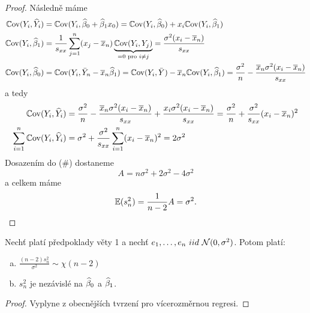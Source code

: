 \begin{proof}
	Následně máme
	\begin{align*}
	\mathbb{C}\mathrm{ov}(Y_i, \widehat{Y}_i) & = \mathbb{C}\mathrm{ov}(Y_i, \widehat{\beta}_0 + \widehat{\beta}_1 x_0) = \mathbb{C}\mathrm{ov}(Y_i, \widehat{\beta}_0) + x_i \mathbb{C}\mathrm{ov}(Y_i, \widehat{\beta}_1) \\
	\mathbb{C}\mathrm{ov}(Y_i, \widehat{\beta}_1) & = \frac{1}{s_{xx}} \sum_{j=1}^{n} (x_j - \overline{x}_n) \underbrace{\mathbb{C}\mathrm{ov}(Y_i, Y_j)}_{= 0 \text{ pro } i \neq j} = \frac{\sigma^2(x_i - \overline{x}_n)}{s_{xx}} \\
	\mathbb{C}\mathrm{ov}(Y_i, \widehat{\beta}_0) & = \mathbb{C}\mathrm{ov}(Y_i, \bar{Y}_n - \overline{x}_n \widehat{\beta}_1) = \mathbb{C}\mathrm{ov}(Y_i, \bar{Y}) - \overline{x}_n \mathbb{C}\mathrm{ov}(Y_i, \widehat{\beta}_1) = \frac{\sigma^2}{n} - \frac{\overline{x}_n \sigma^2 (x_i - \overline{x}_n)}{s_{xx}} \\
	\end{align*}
	a tedy
	\begin{align*}
		\mathbb{C}\mathrm{ov}(Y_i, \widehat{Y}_i) & = \frac{\sigma^2}{n} - \frac{\overline{x}_n \sigma^2 (x_i - \overline{x}_n)}{s_{xx}} + \frac{x_i \sigma^2 (x_i - \overline{x}_n)}{s_{xx}} = \frac{\sigma^2}{n} + \frac{\sigma^2}{s_{xx}}(x_i - \overline{x}_n)^2 \\
		\sum_{i=1}^n \mathbb{C}\mathrm{ov}(Y_i, \widehat{Y}_i) & = \sigma^2 + \frac{\sigma^2}{s_{xx}} \sum_{i=1}^n (x_i - \overline{x}_n)^2 = 2 \sigma^2 \\
	\end{align*}
	Dosazením do ($\#$) dostaneme
	$$
		A  = n\sigma^2 + 2\sigma^2 - 4\sigma^2
	$$
	a celkem máme
	$$
		\mathbb{E}(s_n^2)  = \frac{1}{n-2} A = \sigma^2.
	$$
\end{proof}

\begin{corollary}
	Nechť platí předpoklady věty 1 a nechť $e_1, \dots, e_n~iid~\mathcal{N}(0,\sigma^2)$. Potom platí:
	\begin{enumerate}[a)]
		\item $\frac{(n-2)s_n^2}{\sigma^2} \sim \chi(n-2)$
		\item $s_n^2$ je nezávislé na $\widehat{\beta}_0$ a $\widehat{\beta}_1$.
	\end{enumerate}
\end{corollary}

\begin{proof}
	Vyplyne z obecnějších tvrzení pro vícerozměrnou regresi.
\end{proof}

